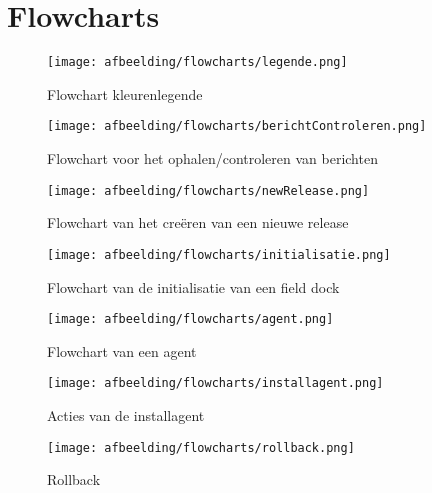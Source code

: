 \chapter{Flowcharts}
\begin{figure}[!ht]
\centering
\texttt{[image: afbeelding/flowcharts/legende.png]}
\caption{Flowchart kleurenlegende}
\label{fig:flow:legende}
\end{figure}

\begin{figure}[!ht]
\centering
\texttt{[image: afbeelding/flowcharts/berichtControleren.png]}
\caption{Flowchart voor het ophalen/controleren van berichten}
\label{fig:flow:bericht}
\end{figure}

\begin{figure}[!ht]
\centering
\texttt{[image: afbeelding/flowcharts/newRelease.png]}
\caption{Flowchart van het creëren van een nieuwe release}
\label{fig:flow:release}
\end{figure}

\begin{figure}[!ht]
\centering
\texttt{[image: afbeelding/flowcharts/initialisatie.png]}
\caption{Flowchart van de initialisatie van een field dock}
\label{fig:flow:init}
\end{figure}

\begin{figure}[!ht]
\centering
\texttt{[image: afbeelding/flowcharts/agent.png]}
\caption{Flowchart van een agent}
\label{fig:flow:agent}
\end{figure}

\begin{figure}[!ht]
\centering
\texttt{[image: afbeelding/flowcharts/installagent.png]}
\caption{Acties van de installagent}
\label{fig:flow:install}
\end{figure}

\begin{figure}[!ht]
\centering
\texttt{[image: afbeelding/flowcharts/rollback.png]}
\caption{Rollback}
\label{fig:flow:rollback}
\end{figure}
